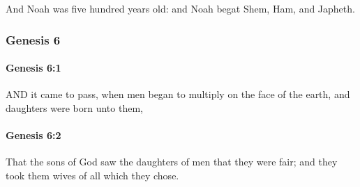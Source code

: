 			And Noah was five hundred years old: and Noah begat Shem, Ham, and Japheth.


	\subsubsection{Genesis 6} %
		\label{GENESIS-6}
		
		\paragraph{Genesis 6:1} %
			\label{GENESIS-6-1}

			AND it came to pass, when men began to multiply on the face of the earth, and daughters were born unto them,


		\paragraph{Genesis 6:2} %
			\label{GENESIS-6-2}

			That the sons of God saw the daughters of men that they were fair; and they took them wives of all which they chose.


